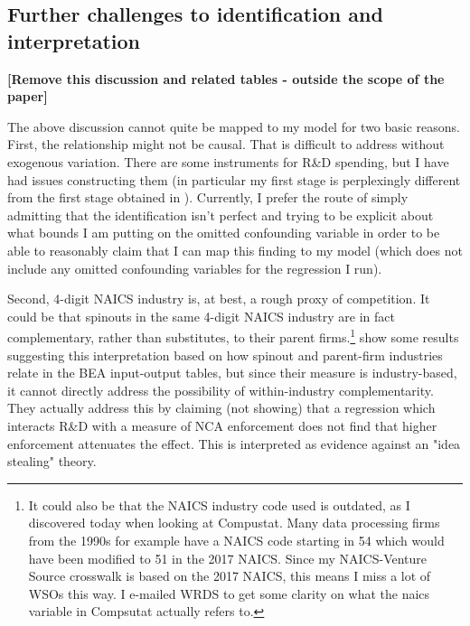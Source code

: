 \subsection{Further challenges to identification and interpretation}

\textbf{[Remove this discussion and related tables - outside the scope of the paper]}

The above discussion cannot quite be mapped to my model for two basic reasons. First, the relationship might not be causal. That is difficult to address without exogenous variation. There are some instruments for R\&D spending, but I have had issues constructing them (in particular my first stage is perplexingly different from the first stage obtained in \cite{babina_entrepreneurial_2019}). Currently, I prefer the route of simply admitting that the identification isn't perfect and trying to be explicit about what bounds I am putting on the omitted confounding variable in order to be able to reasonably claim that I can map this finding to my model (which does not include any omitted confounding variables for the regression I run). 

Second, 4-digit NAICS industry is, at best, a rough proxy of competition. It could be that spinouts in the same 4-digit NAICS industry are in fact complementary, rather than substitutes, to their parent firms.\footnote{It could also be that the NAICS industry code used is outdated, as I discovered today when looking at Compustat. Many data processing firms from the 1990s for example have a NAICS code starting in 54 which would have been modified to 51 in the 2017 NAICS. Since my NAICS-Venture Source crosswalk is based on the 2017 NAICS, this means I miss a lot of WSOs this way. I e-mailed WRDS to get some clarity on what the naics variable in Compsutat actually refers to.} \cite{babina_entrepreneurial_2019} show some results suggesting this interpretation based on how spinout and parent-firm industries relate in the BEA input-output tables, but since their measure is industry-based, it cannot directly address the possibility of within-industry complementarity. They actually address this by claiming (not showing) that a regression which interacts R\&D with a measure of NCA enforcement does not find that higher enforcement attenuates the effect. This is interpreted as evidence against an "idea stealing" theory.  


